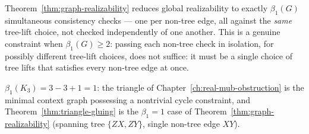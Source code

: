 \begin{remark}
Theorem~\ref{thm:graph-realizability} reduces global realizability to exactly
$\beta_1(G)$ simultaneous consistency checks — one per non-tree edge, all
against the \emph{same} tree-lift choice, not checked independently of one
another. This is a genuine constraint when $\beta_1(G) \ge 2$: passing each
non-tree check in isolation, for possibly different tree-lift choices, does
not suffice: it must be a single choice of tree lifts that satisfies every
non-tree edge at once.
\end{remark}

\begin{corollary}
\label{cor:triangle-minimal}
$\beta_1(K_3) = 3-3+1 = 1$: the triangle of
Chapter~\ref{ch:real-mub-obstruction} is the minimal context graph possessing
a nontrivial cycle constraint, and Theorem~\ref{thm:triangle-gluing} is the
$\beta_1=1$ case of Theorem~\ref{thm:graph-realizability} (spanning tree
$\{ZX,ZY\}$, single non-tree edge $XY$).
\end{corollary}

